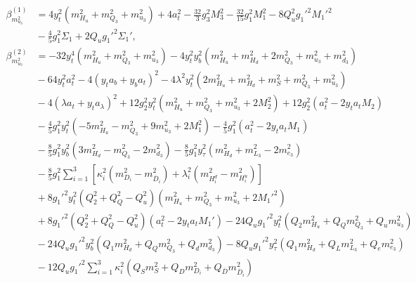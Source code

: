 \documentclass[preprint,amsmath,amssymb,aps,superscriptaddress,prd,
showpacs,floatfix,nofootinbib]{revtex4-1}
\begin{document}
\begin{subequations}
\begin{align}
\beta_{m_{u_3}^2}^{(1)} &= 4 y_t^2 \left ( m_{H_u}^2 + m_{Q_3}^2 + m_{u_3}^2
\right ) + 4 a_t^2 - \frac{32}{3} g_3^2 M_3^2 - \frac{32}{15} g_1^2 M_1^2
- 8 Q_u^2 g_1'^2 M_1'^2 \nonumber \\
& {} - \frac{4}{5} g_1^2 \Sigma_1 + 2 Q_u g_1'^2 \Sigma_1' ,
\label{eq:USSMmu222BetaOneLoop} \\
\beta_{m_{u_3}^2}^{(2)} &= -32 y_t^4 \left ( m_{H_u}^2 + m_{Q_3}^2 + m_{u_3}^2
\right ) - 4 y_t^2 y_b^2 \left ( m_{H_u}^2 + m_{H_d}^2 + 2 m_{Q_3}^2 +
m_{u_3}^2 + m_{d_3}^2 \right ) \nonumber \\
& {} - 64 y_t^2 a_t^2 -4 \left ( y_t a_b + y_b a_t \right )^2 -
4 \lambda^2 y_t^2 \left ( 2 m_{H_u}^2 + m_{H_d}^2 + m_S^2 + m_{Q_3}^2 +
m_{u_3}^2 \right ) \nonumber \\
& {} - 4 \left ( \lambda a_t + y_t a_\lambda \right )^2 + 12 g_2^2 y_t^2
\left ( m_{H_u}^2 + m_{Q_3}^2 + m_{u_3}^2 + 2 M_2^2 \right ) + 12 g_2^2
\left ( a_t^2 - 2 y_t a_t M_2 \right ) \nonumber \\
& {} - \frac{4}{5} g_1^2 y_t^2 \left ( -5 m_{H_u}^2 - m_{Q_3}^2 + 9 m_{u_3}^2
+ 2 M_1^2 \right ) - \frac{4}{5} g_1^2 \left ( a_t^2 - 2 y_t a_t M_1 \right )
\nonumber \\
& {} - \frac{8}{5} g_1^2 y_b^2 \left ( 3 m_{H_d}^2 - m_{Q_3}^2 - 2 m_{d_3}^2
\right ) - \frac{8}{5} g_1^2 y_\tau^2 \left ( m_{H_d}^2 + m_{L_3}^2 -
2 m_{e_3}^2 \right ) \nonumber \\
& {} - \frac{8}{5} g_1^2 \sum_{i=1}^3 \left [ \kappa_i^2 \left ( m_{D_i}^2 -
m_{\overline{D}_i}^2 \right ) + \lambda_i^2 \left ( m_{H_i^d}^2 - m_{H_i^u}^2
\right ) \right ] \nonumber \\
& {} + 8 g_1'^2 y_t^2 \left ( Q_2^2 + Q_Q^2 - Q_u^2 \right ) \left ( m_{H_u}^2
+ m_{Q_3}^2 + m_{u_3}^2 + 2 M_1'^2 \right ) \nonumber \\
& {} + 8 g_1'^2 \left ( Q_2^2 + Q_Q^2 - Q_u^2 \right ) \left ( a_t^2 -
2 y_t a_t M_1' \right ) - 24 Q_u g_1'^2 y_t^2 \left ( Q_2 m_{H_u}^2 +
Q_Q m_{Q_3}^2 + Q_u m_{u_3}^2 \right ) \nonumber \\
& {} - 24 Q_u g_1'^2 y_b^2 \left ( Q_1 m_{H_d}^2 + Q_Q m_{Q_3}^2 +
Q_d m_{d_3}^2 \right ) - 8 Q_u g_1'^2 y_\tau^2 \left ( Q_1 m_{H_d}^2 +
Q_L m_{L_3}^2 + Q_e m_{e_3}^2 \right ) \nonumber \\
& {} - 12 Q_u g_1'^2 \sum_{i=1}^3 \kappa_i^2 \left ( Q_S m_S^2 + Q_D m_{D_i}^2
+ Q_{\overline{D}} m_{\overline{D}_i}^2 \right ) \nonumber \\

\end{align}
\end{subequations}
\end{document}

